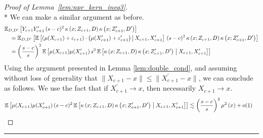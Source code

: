 \begin{proof}[Proof of Lemma~\ref{lem:npr_kern_ineq3}]\mbox{}\\*
	We can make a similar argument as before.
	\begin{equation}
		\begin{aligned}
			& \mathbb{E}_{D, D^{\prime}}\left[Y_{c+1}Y_{c+1}^{\prime} \, (s-c)^2 \, \kappa\left(x; Z_{c+1}, D\right)\kappa\left(x; Z_{c+1}^{\prime}, D^{\prime}\right)\right]\\
			& \quad = \mathbb{E}_{D, D^{\prime}}\left[\mathbb{E}\left[\left(\mu(X_{c+1}) + \varepsilon_{c+1}\right) \cdot \left(\mu(X_{c+1}^{\prime}) + \varepsilon_{c+1}^{\prime}\right) \, \middle| \, X_{c+1}, X_{c+1}^{\prime}\right] \, (s-c)^2 \, \kappa\left(x; Z_{c+1}, D\right)\kappa\left(x; Z_{c+1}^{\prime}, D^{\prime}\right)\right] \\
			& \quad = \left(\frac{s-c}{s}\right)^2\mathbb{E}\left[\mu(X_{c+1})\mu(X_{c+1}^{\prime}) \, s^2 \, 
			\mathbb{E}\left[\kappa\left(x; Z_{c+1}, D\right)\kappa\left(x; Z_{c+1}^{\prime}, D^{\prime}\right) \; \middle| \; X_{c+1}, X_{c+1}^{\prime}\right]\right]
        \end{aligned}
    \end{equation}
    Using the argument presented in Lemma \ref{lem:double_cond}, and assuming without loss of generality that $\|X_{c+1} - x\| \leq \|X_{c+1}^{\prime} - x\|$, we can conclude as follows.
    We use the fact that if $X_{c+1}^{\prime} \rightarrow x$, then necessarily $X_{c+1}\rightarrow x$.
    \begin{equation}
        \begin{aligned}
            & \mathbb{E}\left[\mu(X_{c+1})\mu(X_{c+1}^{\prime}) \, (s-c)^2 \, 
			\mathbb{E}\left[\kappa\left(x; Z_{c+1}, D\right)\kappa\left(x; Z_{c+1}^{\prime}, D^{\prime}\right) \; \middle| \; X_{c+1}, X_{c+1}^{\prime}\right]\right]
            \lesssim \left(\frac{s - c}{s}\right)^{2} \mu^{2}\left(x\right) + o(1)
		\end{aligned}
	\end{equation}
\end{proof}

\hrule

